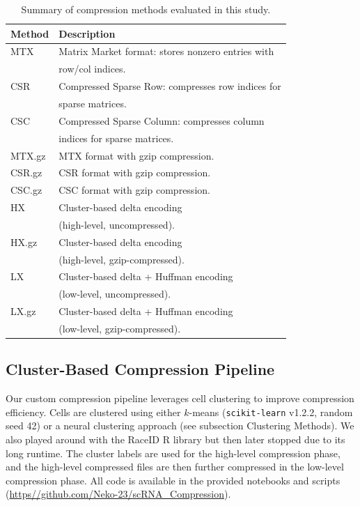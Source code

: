 \documentclass[unnumsec,webpdf,contemporary,large]{oup-authoring-template}
\begin{document}
\begin{table}[h!]
\centering
\caption{Summary of compression methods evaluated in this study.}
\begin{tabular}{ll}
\hline
Method & Description \\
\hline
MTX & Matrix Market format: stores nonzero entries with \\ & row/col indices. \\
CSR & Compressed Sparse Row: compresses row indices for \\ & sparse matrices. \\
CSC & Compressed Sparse Column: compresses column \\ & indices for sparse matrices. \\
MTX.gz & MTX format with gzip compression. \\
CSR.gz & CSR format with gzip compression. \\
CSC.gz & CSC format with gzip compression. \\
HX & Cluster-based delta encoding \\ & (high-level, uncompressed). \\
HX.gz & Cluster-based delta encoding \\ & (high-level, gzip-compressed). \\
LX & Cluster-based delta + Huffman encoding \\ & (low-level, uncompressed). \\
LX.gz & Cluster-based delta + Huffman encoding \\ & (low-level, gzip-compressed). \\
\hline
\end{tabular}
\label{tab:summary_methods}
\end{table}

\subsection{Cluster-Based Compression Pipeline}
Our custom compression pipeline leverages cell clustering to improve compression efficiency. Cells are clustered using either $k$-means (\texttt{scikit-learn} v1.2.2, random seed 42) or a neural clustering approach (see subsection Clustering Methods). We also played around with the RaceID R library but then later stopped due to its long runtime. The cluster labels are used for the high-level compression phase, and the high-level compressed files are then further compressed in the low-level compression phase. All code is available in the provided notebooks and scripts (\href{https://github.com/Neko-23/scRNA_Compression}{https\://github.com/Neko-23/scRNA\_Compression}). 
\end{document}
